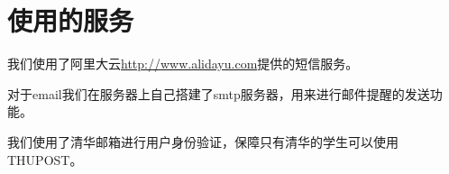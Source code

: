 \section{使用的服务}
我们使用了阿里大云\url{http://www.alidayu.com}提供的短信服务。

对于email我们在服务器上自己搭建了smtp服务器，用来进行邮件提醒的发送功能。

我们使用了清华邮箱进行用户身份验证，保障只有清华的学生可以使用THUPOST。